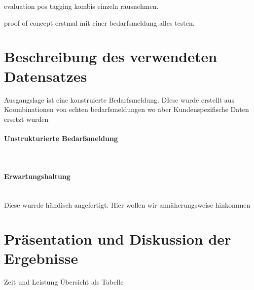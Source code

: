 evaluation pos tagging kombis einzeln rausnehmen.

proof of concept erstmal mit einer bedarfsmeldung alles testen.

\section{Beschreibung des verwendeten Datensatzes}
Ausgangslage ist eine konstruierte Bedarfsmeldung. DIese wurde erstellt aus Koombinationen von echten bedarfsmeldungen wo aber Kundenspezifische Daten ersetzt wurden

\paragraph{Unstrukturierte Bedarfsmeldung}\mbox{}\\
\paragraph{Erwartungshaltung}\mbox{}\\
Diese wurrde händisch angefertigt. Hier wollen wir annäherungsweise hinkommen
\newpage

\section{Präsentation und Diskussion der Ergebnisse}
Zeit und Leistung Übersicht als Tabelle

\newpage
